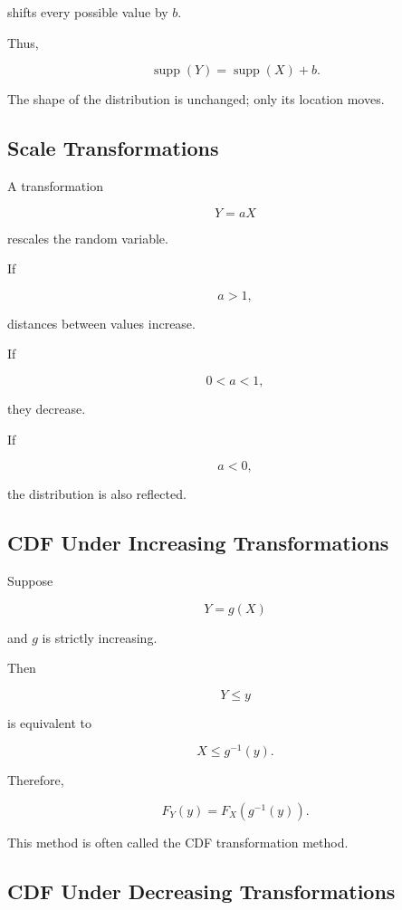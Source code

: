 shifts every possible value by \(b\).

Thus,

\[
\boxed{
\operatorname{supp}(Y)
=
\operatorname{supp}(X)+b.
}
\]

The shape of the distribution is unchanged; only its location moves.

\subsection{Scale Transformations}
\label{subsec:scale-transformations}

A transformation

\[
Y=aX
\]

rescales the random variable.

If

\[
a>1,
\]

distances between values increase.

If

\[
0<a<1,
\]

they decrease.

If

\[
a<0,
\]

the distribution is also reflected.

\subsection{CDF Under Increasing Transformations}
\label{subsec:cdf-increasing-transform}

Suppose

\[
Y=g(X)
\]

and \(g\) is strictly increasing.

Then

\[
Y\leq y
\]

is equivalent to

\[
X\leq g^{-1}(y).
\]

Therefore,

\[
\boxed{
F_Y(y)
=
F_X(g^{-1}(y)).
}
\]

This method is often called the CDF transformation method.

\subsection{CDF Under Decreasing Transformations}
\label{subsec:cdf-decreasing-transform}


